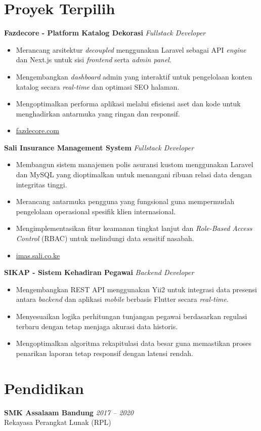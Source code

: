 \documentclass[11pt,a4paper]{article}
\begin{document}
\section*{Proyek Terpilih}

\textbf{Fazdecore - Platform Katalog Dekorasi} \hfill \textit{Fullstack Developer}
\begin{itemize}
    \item Merancang arsitektur \textit{decoupled} menggunakan Laravel sebagai API \textit{engine} dan Next.js untuk sisi \textit{frontend} serta \textit{admin panel}.
    \item Mengembangkan \textit{dashboard} admin yang interaktif untuk pengelolaan konten katalog secara \textit{real-time} dan optimasi SEO halaman.
    \item Mengoptimalkan performa aplikasi melalui efisiensi aset dan kode untuk menghadirkan antarmuka yang ringan dan responsif.
    \item \href{https://fazdecore.com/}{fazdecore.com}
\end{itemize}

\textbf{Sali Insurance Management System} \hfill \textit{Fullstack Developer}
\begin{itemize}
    \item Membangun sistem manajemen polis asuransi kustom menggunakan Laravel dan MySQL yang dioptimalkan untuk menangani ribuan relasi data dengan integritas tinggi.
    \item Merancang antarmuka pengguna yang fungsional guna mempermudah pengelolaan operasional spesifik klien internasional.
    \item Mengimplementasikan fitur keamanan tingkat lanjut dan \textit{Role-Based Access Control} (RBAC) untuk melindungi data sensitif nasabah.
    \item \href{https://imas.sali.co.ke/}{imas.sali.co.ke}
\end{itemize}

\textbf{SIKAP - Sistem Kehadiran Pegawai} \hfill \textit{Backend Developer}
\begin{itemize}
    \item Mengembangkan REST API menggunakan Yii2 untuk integrasi data presensi antara \textit{backend} dan aplikasi \textit{mobile} berbasis Flutter secara \textit{real-time}.
    \item Menyesuaikan logika perhitungan tunjangan pegawai berdasarkan regulasi terbaru dengan tetap menjaga akurasi data historis.
    \item Mengoptimalkan algoritma rekapitulasi data besar guna memastikan proses penarikan laporan tetap responsif dengan latensi rendah.
\end{itemize}

\section*{Pendidikan}
\textbf{SMK Assalaam Bandung} \hfill \textit{2017 -- 2020} \\
Rekayasa Perangkat Lunak (RPL)
\end{document}
